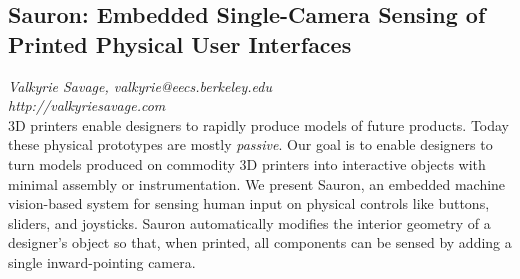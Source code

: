 \documentclass[foldmark,10pt,a4paper,notumble]{leaflet}
\begin{document}
\subsection{Sauron: Embedded Single-Camera Sensing of Printed Physical User Interfaces}
\emph{Valkyrie Savage, valkyrie@eecs.berkeley.edu}\\
\emph{http://valkyriesavage.com}\\
3D printers enable designers to rapidly produce models of future products.  Today these physical prototypes are mostly \emph{passive}.  Our goal is to enable designers to turn models produced on commodity 3D printers into interactive objects with minimal assembly or instrumentation.  We present Sauron, an embedded machine vision-based system for sensing human input on physical controls like buttons, sliders, and joysticks.  Sauron automatically modifies the interior geometry of a designer's object so that, when printed, all components can be sensed by adding a single inward-pointing camera.
\end{document}
